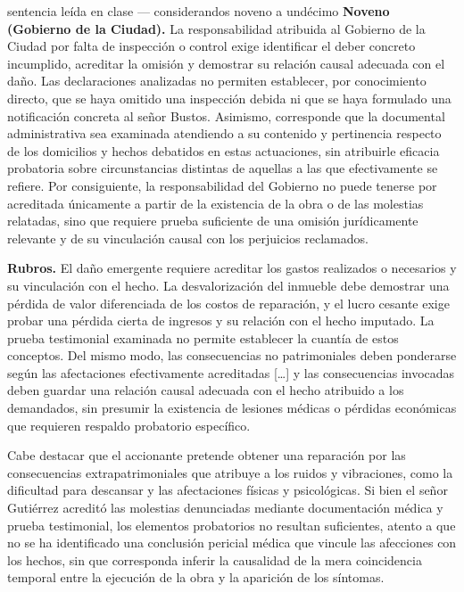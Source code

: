 \documentclass[12pt,oneside]{book}
\begin{document}
\begin{example}{sentencia le\'ida en clase --- considerandos noveno a und\'ecimo}
\textbf{Noveno (Gobierno de la Ciudad).} La responsabilidad atribuida al Gobierno de la Ciudad por falta de inspecci\'on o control exige identificar el deber concreto incumplido, acreditar la omisi\'on y demostrar su relaci\'on causal adecuada con el da\~no. Las declaraciones analizadas no permiten establecer, por conocimiento directo, que se haya omitido una inspecci\'on debida ni que se haya formulado una notificaci\'on concreta al se\~nor Bustos. Asimismo, corresponde que la documental administrativa sea examinada atendiendo a su contenido y pertinencia respecto de los domicilios y hechos debatidos en estas actuaciones, sin atribuirle eficacia probatoria sobre circunstancias distintas de aquellas a las que efectivamente se refiere. Por consiguiente, la responsabilidad del Gobierno no puede tenerse por acreditada \'unicamente a partir de la existencia de la obra o de las molestias relatadas, sino que requiere prueba suficiente de una omisi\'on jur\'idicamente relevante y de su vinculaci\'on causal con los perjuicios reclamados.

\textbf{Rubros.} El da\~no emergente requiere acreditar los gastos realizados o necesarios y su vinculaci\'on con el hecho. La desvalorizaci\'on del inmueble debe demostrar una p\'erdida de valor diferenciada de los costos de reparaci\'on, y el lucro cesante exige probar una p\'erdida cierta de ingresos y su relaci\'on con el hecho imputado. La prueba testimonial examinada no permite establecer la cuant\'ia de estos conceptos. Del mismo modo, las consecuencias no patrimoniales deben ponderarse seg\'un las afectaciones efectivamente acreditadas [\ldots] y las consecuencias invocadas deben guardar una relaci\'on causal adecuada con el hecho atribuido a los demandados, sin presumir la existencia de lesiones m\'edicas o p\'erdidas econ\'omicas que requieren respaldo probatorio espec\'ifico.

Cabe destacar que el accionante pretende obtener una reparaci\'on por las consecuencias extrapatrimoniales que atribuye a los ruidos y vibraciones, como la dificultad para descansar y las afectaciones f\'isicas y psicol\'ogicas. Si bien el se\~nor Guti\'errez acredit\'o las molestias denunciadas mediante documentaci\'on m\'edica y prueba testimonial, los elementos probatorios no resultan suficientes, atento a que no se ha identificado una conclusi\'on pericial m\'edica que vincule las afecciones con los hechos, sin que corresponda inferir la causalidad de la mera coincidencia temporal entre la ejecuci\'on de la obra y la aparici\'on de los s\'intomas.
\end{example}
\end{document}

